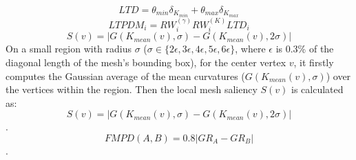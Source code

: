 \begin{equation}
LTD =\theta_{min} \delta_{K_{min}} +\theta_{max} \delta_{K_{max}}
\end{equation}
\begin{equation}
LTPDM_i =RW^{(\gamma)}_iRW^{(K)}_iLTD_i
\end{equation}
\begin{equation}
S(v)= |G(K_{mean}(v), \sigma) - G(K_{mean}(v), 2\sigma)|
\end{equation}
On a small region with radius $\sigma$ ($\sigma \in \{ 2\epsilon, 3\epsilon, 4\epsilon, 5\epsilon, 6\epsilon \}$, where $\epsilon$ is 0.3\% of the diagonal length of the mesh’s bounding box), for the center vertex $v$, it firstly computes the Gaussian average of the mean curvatures ($G(K_{mean}(v), \sigma)$) over the vertices within the region. Then the local mesh saliency $S(v)$ is calculated as:
\begin{equation}
S(v)= |G(K_{mean}(v), \sigma) - G(K_{mean}(v), 2\sigma)|
\end{equation}.
\begin{equation}
FMPD(A,B)= 0.8|GR_A-GR_B|
\end{equation}.

